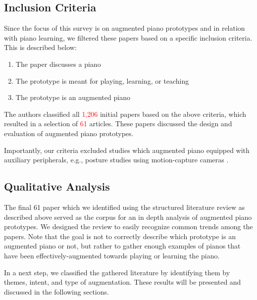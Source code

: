 \documentclass[sigchi, review]{acmart}
\newcommand{\red}[1]{\textcolor{red}{#1}}
\begin{document}
\subsection{Inclusion Criteria}
Since the focus of this survey is on augmented piano prototypes and in relation with piano learning, we filtered these papers based on a specific inclusion criteria. This is described below: 
\begin{enumerate}
    \item The paper discusses a piano
    \item The prototype is meant for playing, learning, or teaching
    \item The prototype is an augmented piano%
\end{enumerate}
The authors classified all \red{1,206} initial papers based on the above criteria, which resulted in a selection of \red{61} articles. These papers discussed the design and evaluation of augmented piano prototypes.

Importantly, our criteria excluded studies which augmented piano equipped with auxiliary peripherals, e.g., posture studies using motion-capture cameras \cite{}.

\subsection{Qualitative Analysis}

The final 61 paper which we identified using the structured literature review as described above served as the corpus for an in depth analysis of augmented piano prototypes. We designed the review to easily recognize common trends among the papers. Note that the goal is not to correctly describe which prototype is an augmented piano or not, but rather to gather enough examples of pianos that have been effectively-augmented towards playing or learning the piano.  

In a next step, we classified the gathered literature by identifying them by themes, intent, and type of augmentation. These results will be presented and discussed in the following sections. 

\end{document}
